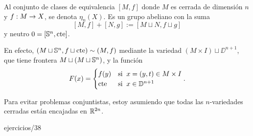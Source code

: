 \documentclass[../../topologia_algebraica]{subfiles}
\begin{document}
\begin{defin}
  Al conjunto de clases de equivalencia $[M,f]$ donde $M$ es cerrada de dimensi\'on $n$ y $f:M\rightarrow X$,
  se denota $\eta_n(X)$. Es un grupo abeliano con la suma
  \[
    [M,f]+[N,g]:=[M\sqcup N,f\sqcup g]
  \]
  y neutro $0=[\mathbb{S}^n,\text{cte}]$.
\end{defin}

En efecto, $(M\sqcup\mathbb{S}^n,f\sqcup\text{cte})\sim(M,f)$ mediante la variedad $(M\times I)\sqcup \DD^{n+1}$,
que tiene frontera $M\sqcup (M\sqcup\mathbb{S}^n)$, y la funci\'on
\[
  F(x)=
  \begin{cases}
    f(y) &\text{si}\;\; x=(y,t)\in M\times I \\
    \text{cte} &\text{si}\;\; x\in\mathbb{D}^{n+1}
  \end{cases}.
\]

\begin{nota}
  Para evitar problemas conjuntistas, estoy asumiendo que todas las $n$-variedades cerradas est\'an
  encajadas en $\mathbb{R}^{2n}$.
\end{nota}

{ejercicios/38} %
\end{document}
